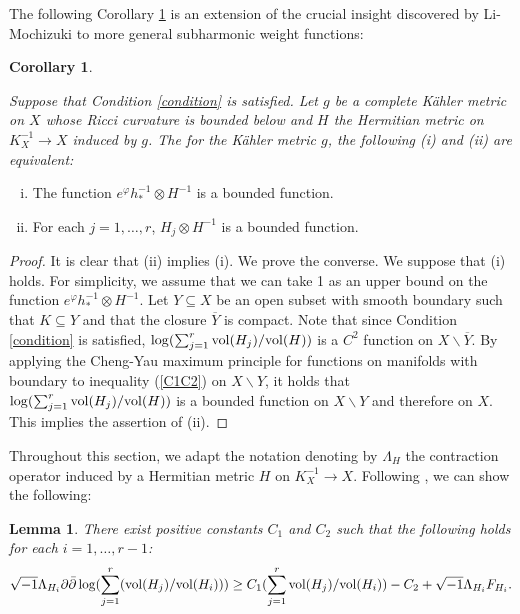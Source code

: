 \documentclass[12pt]{article}
\theoremstyle{definition}
\newtheorem{lemm}[defi]{Lemma}
\newtheorem{cor}[defi]{Corollary}
\def\refe{\ast}
\def\vol{{\rm vol}}
\def\inum{{\sqrt{-1}}}
\begin{document}
The following Corollary \ref{CYM} is an extension of the crucial insight discovered by Li-Mochizuki \cite[Section 3.3]{LM1} to more general subharmonic weight functions:
\begin{cor}\label{CYM}{\it Suppose that Condition \ref{condition} is satisfied. Let $g$ be a complete K\"ahler metric on $X$ whose Ricci curvature is bounded below and $H$ the Hermitian metric on $K_X^{-1}\rightarrow X$ induced by $g$. The for the K\"ahler metric $g$, the following (i) and (ii) are equivalent:
\begin{enumerate}[(i)]
\item The function $e^{\varphi}h_\refe^{-1}\otimes H^{-1}$ is a bounded function.
\item For each $j=1,\dots, r$, $H_j\otimes H^{-1}$ is a bounded function. 
\end{enumerate}
}
\end{cor}
\begin{proof} It is clear that (ii) implies (i). We prove the converse. We suppose that (i) holds. For simplicity, we assume that we can take 1 as an upper bound on the function $e^\varphi h_\refe^{-1}\otimes H^{-1}$. Let $Y\subseteq X$ be an open subset with smooth boundary such that $K\subseteq Y$ and that the closure $\overline{Y}$ is compact. 
Note that since Condition \ref{condition} is satisfied, $\log(\sum_{j=1}^r\vol(H_j)/\vol(H))$ is a $C^2$ function on $X\backslash \overline{Y}$. By applying the Cheng-Yau maximum principle for functions on manifolds with boundary to inequality (\ref{C1C2}) on $X\backslash Y$, it holds that $\log(\sum_{j=1}^r\vol(H_j)/\vol(H))$ is a bounded function on $X\backslash Y$ and therefore on $X$. This implies the assertion of (ii).
\end{proof}
Throughout this section, we adapt the notation denoting by $\Lambda_H$ the contraction operator induced by a Hermitian metric $H$ on $K_X^{-1}\rightarrow X$. Following \cite[Lemma 3.22]{LM1}, we can show the following:
\begin{lemm}\label{log}{\it There exist positive constants $C_1$ and $C_2$ such that the following holds for each $i=1,\dots, r-1$:
\begin{align}
\inum\Lambda_{H_i}\partial\bar{\partial} \log(\sum_{j=1}^r(\vol(H_j)/\vol(H_i))) \geq C_1(\sum_{j=1}^r\vol(H_j)/\vol(H_i))-C_2+\inum \Lambda_{H_i}F_{H_i}. \label{Hi}
\end{align}
}
\end{lemm}
\end{document}
